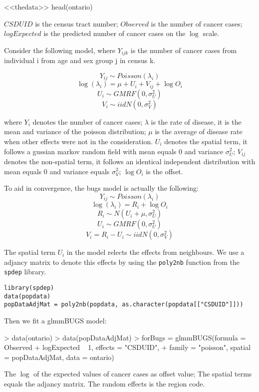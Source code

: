 \documentclass{article}
\begin{document}
<<thedata>>
head(ontario)

$CSDUID$ is the census tract number; 
$Observed$ is the number of cancer cases; 
$logExpected$ is the predicted number of cancer cases on the $\log$ scale.

Consider the following model, where $Y_{ijk}$ is the number of cancer cases from individual i from age and sex group j in census k.  

\[Y_{ij} \sim  Poisson(\lambda_i)\]
\[\log(\lambda_i) = \mu + U_i + V_{ij}+ \log{O_i}\]
\[U_i \sim GMRF(0, \sigma_U^2)\]
\[V_i \sim iid N(0, \sigma_V^2)\] 

where $Y_i$ denotes the number of cancer cases;  
$\lambda$ is the rate of disease, it is the mean and variance of the poisson distribution; 
$\mu$ is the average of disease rate when other effects were not in the consideration.
$U_i$ denotes the spatial term, it follows a gussian markov random field with mean equals $0$ and variance $\sigma_U^2$; 
$V_{ij}$ denotes the non-spatial term, it follows an identical independent distribution with mean equals $0$ and variance equals $\sigma_V^2$; 
$\log{O_i}$ is the offset.


To aid in convergence, the bugs model is actually the following:
\[Y_{ij} \sim  Poisson(\lambda_i)\]
\[\log(\lambda_i) = R_i+ \log{O_i}\]
\[R_i \sim N(U_i + \mu, \sigma_U^2)\]
\[U_i \sim GMRF(0, \sigma_U^2)\]
\[V_{i} = R_i - U_i \sim iid N(0, \sigma_V^2)\] 

The spatial term $U_i$ in the model relects the effects from neighbours. We use a adjancy matrix to denote this effects by using the \verb!poly2nb! function from the \verb!spdep! library. 

\begin{verbatim}
library(spdep)
data(popdata)
popDataAdjMat = poly2nb(popdata, as.character(popdata[["CSDUID"]]))
\end{verbatim}

Then we fit a glmmBUGS model: 
\begin{Schunk}
\begin{Sinput}
> data(ontario)
> data(popDataAdjMat)
> forBugs = glmmBUGS(formula = Observed + logExpected ~ 1, effects = "CSDUID", 
+     family = "poisson", spatial = popDataAdjMat, data = ontario)
\end{Sinput}
\end{Schunk}

The $\log$ of the expected values of cancer cases as offset value; The spatial terms equals the adjancy matrix. The random effects is the region code.
\end{document}

